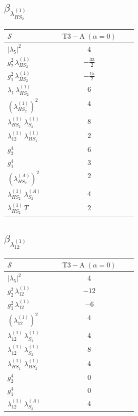 \documentclass[9pt]{article}
\begin{document}
\subsection*{$ \beta_{\lambda_{HS_2}^{(1)}} $}
\begin{longtable}{@{}p{0.31\linewidth}c@{}}
\toprule
$\mathcal{S}$ & $ \mathrm{T3-A}\;(\alpha=0) $ \\
\midrule
$ |\lambda_5|^2 $ & $ 4 $ \\
$ g_2^2\,\lambda_{HS_2}^{(1)} $ & $ - \frac{33}{2} $ \\
$ g_1^2\,\lambda_{HS_2}^{(1)} $ & $ - \frac{15}{2} $ \\
$ \lambda_1\,\lambda_{HS_2}^{(1)} $ & $ 6 $ \\
$ \left(\lambda_{HS_2}^{(1)}\right)^2 $ & $ 4 $ \\
$ \lambda_{HS_2}^{(1)}\,\lambda_{S_2}^{(1)} $ & $ 8 $ \\
$ \lambda_{12}^{(1)}\,\lambda_{HS_1}^{(1)} $ & $ 2 $ \\
$ g_2^4 $ & $ 6 $ \\
$ g_1^4 $ & $ 3 $ \\
$ \left(\lambda_{HS_2}^{(A)}\right)^2 $ & $ 2 $ \\
$ \lambda_{HS_2}^{(1)}\,\lambda_{S_2}^{(A)} $ & $ 4 $ \\
$ \lambda_{HS_2}^{(1)}\,T $ & $ 2 $ \\
\bottomrule
\end{longtable}
\subsection*{$ \beta_{\lambda_{12}^{(1)}} $}
\begin{longtable}{@{}p{0.31\linewidth}c@{}}
\toprule
$\mathcal{S}$ & $ \mathrm{T3-A}\;(\alpha=0) $ \\
\midrule
$ |\lambda_5|^2 $ & $ 4 $ \\
$ g_2^2\,\lambda_{12}^{(1)} $ & $ -12 $ \\
$ g_1^2\,\lambda_{12}^{(1)} $ & $ -6 $ \\
$ \left(\lambda_{12}^{(1)}\right)^2 $ & $ 4 $ \\
$ \lambda_{12}^{(1)}\,\lambda_{S_1}^{(1)} $ & $ 4 $ \\
$ \lambda_{12}^{(1)}\,\lambda_{S_2}^{(1)} $ & $ 8 $ \\
$ \lambda_{HS_1}^{(1)}\,\lambda_{HS_2}^{(1)} $ & $ 4 $ \\
$ g_2^4 $ & $ 0 $ \\
$ g_1^4 $ & $ 0 $ \\
$ \lambda_{12}^{(1)}\,\lambda_{S_2}^{(A)} $ & $ 4 $ \\
\bottomrule
\end{longtable}
\end{document}
